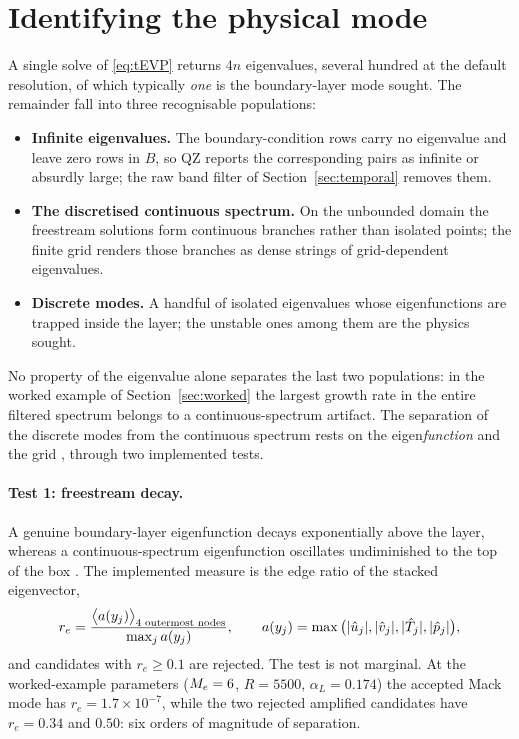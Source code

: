 \documentclass[11pt]{article}
\begin{document}
\section{Identifying the physical mode}\label{sec:modes}
A single solve of \eqref{eq:tEVP} returns $4n$ eigenvalues, several hundred at the default
resolution, of which typically \emph{one} is the boundary-layer mode sought. The remainder fall
into three recognisable populations:
\begin{itemize}[nosep,leftmargin=1.6em]
  \item \textbf{Infinite eigenvalues.} The boundary-condition rows carry no eigenvalue and leave
        zero rows in $B$, so QZ reports the corresponding pairs as infinite or absurdly large;
        the raw band filter of Section~\ref{sec:temporal} removes them.
  \item \textbf{The discretised continuous spectrum.} On the unbounded domain the freestream
        solutions form continuous branches rather than isolated points; the finite grid renders
        those branches as dense strings of grid-dependent eigenvalues.
  \item \textbf{Discrete modes.} A handful of isolated eigenvalues whose eigenfunctions are
        trapped inside the layer; the unstable ones among them are the physics sought.
\end{itemize}
No property of the eigenvalue alone separates the last two populations: in the worked example of
Section~\ref{sec:worked} the largest growth rate in the entire filtered spectrum belongs to a
continuous-spectrum artifact. The separation of the discrete modes from the continuous spectrum rests
on the eigen\emph{function} and the grid \cite{grosch1978,balakumar1992}, through two implemented
tests.

\paragraph{Test 1: freestream decay.} A genuine boundary-layer eigenfunction decays exponentially
above the layer, whereas a continuous-spectrum eigenfunction oscillates undiminished to the top of
the box \cite{balakumar1992}. The implemented measure is the edge ratio of the stacked eigenvector,
\begin{equation}\label{eq:edgeratio}
  r_e=\frac{\big\langle a(y_j)\big\rangle_{\text{4 outermost nodes}}}{\max_j a(y_j)},
  \qquad a(y_j)=\max\big(|\hat{u}_j|,|\hat{v}_j|,|\hat{T}_j|,|\hat{p}_j|\big),
\end{equation}
and candidates with $r_e\ge0.1$ are rejected. The test is not marginal. At the worked-example
parameters ($M_e=6$, $R=5500$, $\alpha_L=0.174$) the accepted Mack mode has
$r_e=1.7\times10^{-7}$, while the two rejected amplified candidates have $r_e=0.34$ and $0.50$:
six orders of magnitude of separation.
\end{document}
